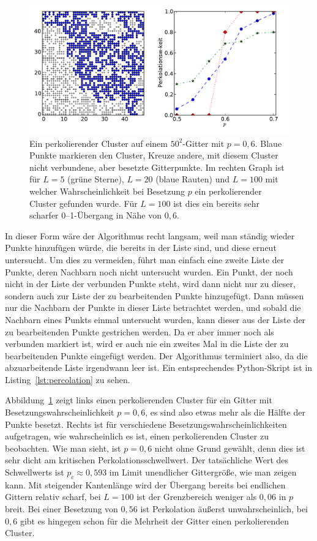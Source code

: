 \begin{figure}
  \centering
  \includegraphics[width=\textwidth]{plots/percolation}
  \caption{Ein perkolierender Cluster auf einem $50^2$-Gitter mit
    $p=0,6$. Blaue Punkte markieren den Cluster, Kreuze andere, mit
    diesem Cluster nicht verbundene, aber besetzte Gitterpunkte. Im
    rechten Graph ist für $L=5$ (grüne Sterne), $L=20$ (blaue
    Rauten) und $L=100$ mit welcher Wahrscheinlichkeit bei
    Besetzung $p$ ein perkolierender Cluster gefunden wurde. Für
    $L=100$ ist dies ein bereits sehr scharfer 0--1-Übergang in Nähe
    von $0,6$.}
  \label{fig:percolation}
\end{figure}

In dieser Form wäre der Algorithmus recht langsam, weil man ständig
wieder Punkte hinzufügen würde, die bereits in der Liste sind, und
diese erneut untersucht. Um dies zu vermeiden, führt man einfach eine
zweite Liste der Punkte, deren Nachbarn noch nicht untersucht
wurden. Ein Punkt, der noch nicht in der Liste der verbunden Punkte
steht, wird dann nicht nur zu dieser, sondern auch zur Liste der zu
bearbeitenden Punkte hinzugefügt. Dann müssen nur die Nachbarn der
Punkte in dieser Liste betrachtet werden, und sobald die Nachbarn
eines Punkts einmal untersucht wurden, kann dieser aus der Liste der
zu bearbeitenden Punkte gestrichen werden. Da er aber immer noch als
verbunden markiert ist, wird er auch nie ein zweites Mal in die Liste
der zu bearbeitenden Punkte eingefügt werden. Der Algorithmus
terminiert also, da die abzuarbeitende Liste irgendwann leer ist. Ein
entsprechendes Python-Skript ist in Listing~\ref{lst:percolation} zu
sehen.

Abbildung~\ref{fig:percolation} zeigt links einen perkolierenden
Cluster für ein Gitter mit Besetzungswahrscheinlichkeit $p=0,6$, es
sind also etwas mehr als die Hälfte der Punkte besetzt. Rechts ist für
verschiedene Besetzungswahrscheinlichkeiten aufgetragen, wie
wahrscheinlich es ist, einen perkolierenden Cluster zu beobachten. Wie
man sieht, ist $p=0,6$ nicht ohne Grund gewählt, denn dies ist sehr
dicht am kritischen Perkolationsschwellwert. Der tatsächliche Wert des
Schwellwerts ist $p_c\approx 0,593$ im Limit unendlicher Gittergröße,
wie man zeigen kann. Mit steigender Kantenlänge wird der Übergang
bereits bei endlichen Gittern relativ scharf, bei $L=100$ ist der
Grenzbereich weniger als $0,06$ in $p$ breit. Bei einer Besetzung von
$0,56$ ist Perkolation äußerst unwahrscheinlich, bei $0,6$ gibt es
hingegen schon für die Mehrheit der Gitter einen perkolierenden
Cluster.


